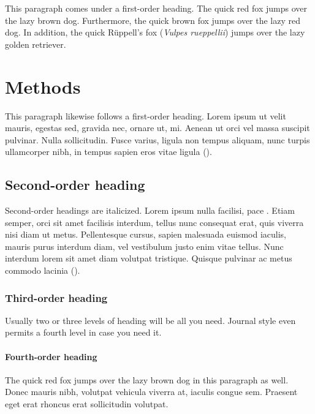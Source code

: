 ﻿\documentclass[11pt]{article}
\begin{document}

This paragraph comes under a first-order heading. The quick red fox jumps over the lazy brown dog. Furthermore, the quick brown fox jumps over the lazy red dog. In addition, the quick R\"{u}ppell's fox (\textit{Vulpes rueppellii}) jumps over the lazy golden retriever.

\section*{Methods}

This paragraph likewise follows a first-order heading. Lorem ipsum ut velit mauris, egestas sed, gravida nec, ornare ut, mi. Aenean ut orci vel massa suscipit pulvinar. Nulla sollicitudin. Fusce varius, ligula non tempus aliquam, nunc turpis ullamcorper nibh, in tempus sapien eros vitae ligula (\citealt{OriginSpec}). 

\subsection*{Second-order heading}

Second-order headings are italicized. Lorem ipsum nulla facilisi, pace \citet{LemKapEx07}. Etiam semper, orci sit amet facilisis interdum, tellus nunc consequat erat, quis viverra nisi diam ut metus. Pellentesque cursus, sapien malesuada euismod iaculis, mauris purus interdum diam, vel vestibulum justo enim vitae tellus. Nunc interdum lorem sit amet diam volutpat tristique. Quisque pulvinar ac metus commodo lacinia (\citealt{Ing11,Xiao2015}).  

\subsubsection*{Third-order heading}

Usually two or three levels of heading will be all you need. Journal style even permits a fourth level in case you need it.

\paragraph*{Fourth-order heading}
The quick red fox jumps over the lazy brown dog in this paragraph as well. Donec mauris nibh, volutpat vehicula viverra at, iaculis congue sem. Praesent eget erat rhoncus erat sollicitudin volutpat. 
\end{document}
